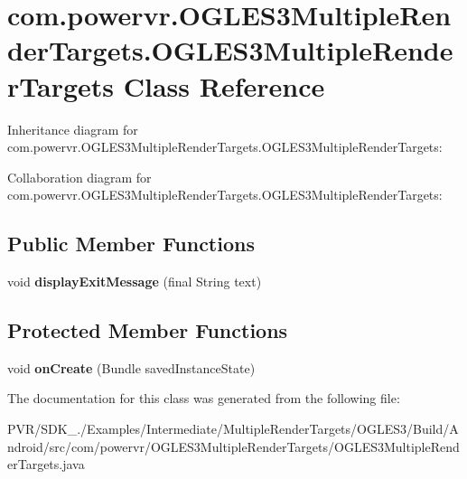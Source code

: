 \hypertarget{classcom_1_1powervr_1_1_o_g_l_e_s3_multiple_render_targets_1_1_o_g_l_e_s3_multiple_render_targets}{\section{com.\+powervr.\+O\+G\+L\+E\+S3\+Multiple\+Render\+Targets.\+O\+G\+L\+E\+S3\+Multiple\+Render\+Targets Class Reference}
\label{classcom_1_1powervr_1_1_o_g_l_e_s3_multiple_render_targets_1_1_o_g_l_e_s3_multiple_render_targets}
}


Inheritance diagram for com.\+powervr.\+O\+G\+L\+E\+S3\+Multiple\+Render\+Targets.\+O\+G\+L\+E\+S3\+Multiple\+Render\+Targets\+:


Collaboration diagram for com.\+powervr.\+O\+G\+L\+E\+S3\+Multiple\+Render\+Targets.\+O\+G\+L\+E\+S3\+Multiple\+Render\+Targets\+:
\subsection*{Public Member Functions}
\begin{DoxyCompactItemize}
\item 
\hypertarget{classcom_1_1powervr_1_1_o_g_l_e_s3_multiple_render_targets_1_1_o_g_l_e_s3_multiple_render_targets_a7e5b91a36411308402458e8a099bbe21}{void {\bfseries display\+Exit\+Message} (final String text)}\label{classcom_1_1powervr_1_1_o_g_l_e_s3_multiple_render_targets_1_1_o_g_l_e_s3_multiple_render_targets_a7e5b91a36411308402458e8a099bbe21}

\end{DoxyCompactItemize}
\subsection*{Protected Member Functions}
\begin{DoxyCompactItemize}
\item 
\hypertarget{classcom_1_1powervr_1_1_o_g_l_e_s3_multiple_render_targets_1_1_o_g_l_e_s3_multiple_render_targets_afd616eefd0cf07de22ae73a6d29c0c82}{void {\bfseries on\+Create} (Bundle saved\+Instance\+State)}\label{classcom_1_1powervr_1_1_o_g_l_e_s3_multiple_render_targets_1_1_o_g_l_e_s3_multiple_render_targets_afd616eefd0cf07de22ae73a6d29c0c82}

\end{DoxyCompactItemize}


The documentation for this class was generated from the following file\+:\begin{DoxyCompactItemize}
\item 
P\+V\+R/\+S\+D\+K\+\_./\+Examples/\+Intermediate/\+Multiple\+Render\+Targets/\+O\+G\+L\+E\+S3/\+Build/\+Android/src/com/powervr/\+O\+G\+L\+E\+S3\+Multiple\+Render\+Targets/O\+G\+L\+E\+S3\+Multiple\+Render\+Targets.\+java\end{DoxyCompactItemize}
